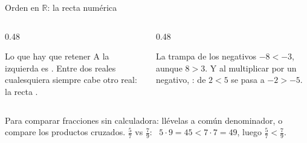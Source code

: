 \documentclass[aspectratio=169,10pt]{beamer}
\begin{document}
\begin{frame}{Orden en $\mathbb{R}$: la recta numérica}
  \scriptsize
  \begin{center}
  \end{center}

  \vspace{0.08cm}
  \begin{columns}[T,onlytextwidth]
    \begin{column}{0.48\textwidth}
      \begin{block}{Lo que hay que retener}
        \tiny
        A la izquierda es . Entre dos reales cualesquiera
        siempre cabe otro real: la recta .
      \end{block}
    \end{column}
    \begin{column}{0.48\textwidth}
      \begin{alertblock}{La trampa de los negativos}
        \tiny
        $-8 < -3$, aunque $8>3$. Y al multiplicar por un negativo,
        :
        de $2<5$ se pasa a $-2>-5$.
      \end{alertblock}
    \end{column}
  \end{columns}

  \vspace{0.08cm}
  {\tiny\color{uniGris} Para comparar fracciones sin calculadora: llévelas a
  común denominador, o compare los productos cruzados.
  $\tfrac{5}{7}$ vs $\tfrac{7}{9}$: \ $5\cdot 9 = 45 < 7\cdot 7 = 49$, luego
  $\tfrac{5}{7} < \tfrac{7}{9}$.}
\end{frame}
\end{document}
